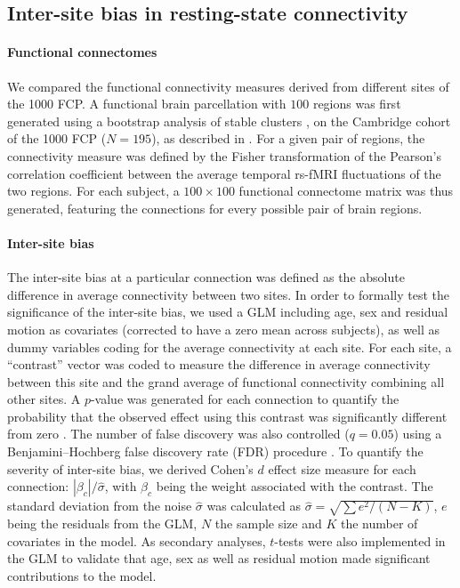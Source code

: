 \documentclass[authoryear]{elsarticle}
\begin{document}
\subsection{Inter-site bias in resting-state connectivity}
\paragraph{Functional connectomes} We compared the functional connectivity measures derived from different sites of the 1000 FCP. A functional brain parcellation with $100$ regions was first generated using a bootstrap analysis of stable clusters \citep{Bellec2010c}, on the Cambridge cohort of the 1000 FCP ($N=195$), as described in \cite{Orban2015}. For a given pair of regions, the connectivity measure was defined by the Fisher transformation of the Pearson's correlation coefficient between the average temporal rs-fMRI fluctuations of the two regions. For each subject, a $100 \times 100$ functional connectome matrix was thus generated, featuring the connections for every possible pair of brain regions. 

\paragraph{Inter-site bias} The inter-site bias at a particular connection was defined as the absolute difference in average connectivity between two sites. In order to formally test the significance of the inter-site bias, we used a GLM including age, sex and residual motion as covariates (corrected to have a zero mean across subjects), as well as dummy variables coding for the average connectivity at each site. For each site, a ``contrast'' vector was coded to measure the difference in average connectivity between this site and the grand average of functional connectivity combining all other sites. A $p$-value was generated for each connection to quantify the probability that the observed effect using this contrast was significantly different from zero \citep{Worsley1995}. The number of false discovery was also controlled ($q=0.05$) using a Benjamini–Hochberg false discovery rate (FDR) procedure \citep{Benjamini1995}.  To quantify the severity of inter-site bias, we derived Cohen's $d$ effect size measure for each connection: $|\beta_c|/\hat{\sigma}$, with $\beta_c$ being the weight associated with the contrast. The standard
deviation from the noise $\hat{\sigma}$ was calculated as $\hat{\sigma}=\sqrt{\sum{e^{2}}/(N-K)}$, $e$ being the residuals from the GLM, $N$
the sample size and $K$ the number of covariates in the model. As secondary analyses, $t$-tests were also implemented in the GLM to validate that age, sex as well as residual motion made significant contributions to the model. 
\end{document}
